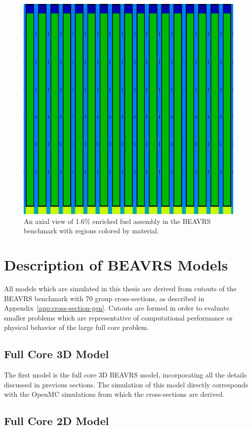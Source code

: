 \begin{figure}[h!]
	\centering
	\includegraphics[width=0.65\linewidth]{figures/beavrs-visual/materials-single-assembly-axial.png}
	\caption{An axial view of 1.6\% enriched fuel assembly in the BEAVRS benchmark with regions colored by material.}
	\label{fig:beavrs-single-assembly-materials-axial}
\end{figure} 

\newpage
\section{Description of BEAVRS Models}
\label{sec:beavrs-models}

All models which are simulated in this thesis are derived from cutouts of the BEAVRS benchmark with 70 group cross-sections, as described in Appendix~\ref{app:cross-section-gen}. Cutouts are formed in order to evaluate smaller problems which are representative of computational performance or physical behavior of the large full core problem.

\subsection{Full Core 3D Model}
\label{app:beavrs-3D}

The first model is the full core 3D BEAVRS model, incorporating all the details discussed in previous sections. The simulation of this model directly corresponds with the OpenMC simulations from which the cross-sections are derived.


\subsection{Full Core 2D Model}
\label{app:beavrs-2D}

